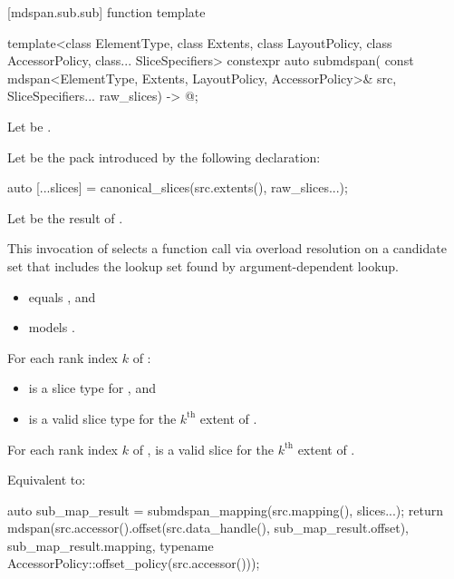 [mdspan.sub.sub]{ function template}

%
\begin{itemdecl}
template<class ElementType, class Extents, class LayoutPolicy,
         class AccessorPolicy, class... SliceSpecifiers>
  constexpr auto submdspan(
    const mdspan<ElementType, Extents, LayoutPolicy, AccessorPolicy>& src,
    SliceSpecifiers... raw_slices) -> @\seebelow@;
\end{itemdecl}

\begin{itemdescr}
\pnum
Let  be .

\pnum
Let  be the pack introduced by the following declaration:
\begin{codeblock}
auto [...slices] = canonical_slices(src.extents(), raw_slices...);
\end{codeblock}

\pnum
Let  be the result of
.
\begin{note}
This invocation of 
selects a function call via overload resolution
on a candidate set that includes the lookup set
found by argument-dependent lookup.
\end{note}

\pnum
\constraints
\begin{itemize}
\item
{} equals , and
\item
{} models .
\end{itemize}

\pnum
\mandates
For each rank index $k$ of :
\begin{itemize}
\item
   is a  slice type
  for , and
\item
   is a valid  slice type
  for the $k^\text{th}$ extent of .
\end{itemize}

\pnum
\expects
For each rank index $k$ of ,
 is a valid  slice
for the $k^\text{th}$ extent of .

\pnum
\effects
Equivalent to:
\begin{codeblock}
auto sub_map_result = submdspan_mapping(src.mapping(), slices...);
return mdspan(src.accessor().offset(src.data_handle(), sub_map_result.offset),
              sub_map_result.mapping,
              typename AccessorPolicy::offset_policy(src.accessor()));
\end{codeblock}
\end{itemdescr}

